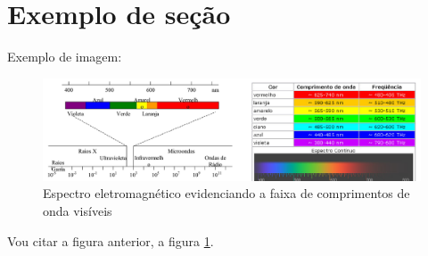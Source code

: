 \section*{Exemplo de seção}
Exemplo de imagem:
\begin{figure}[h]                                                         %
\includegraphics[width=.7\paperwidth]{figura1} %
\caption{Espectro eletromagnético evidenciando a faixa de comprimentos de onda visíveis}
\label{fig:espectro}
\end{figure}
Vou citar a figura anterior, a figura \ref{fig:espectro}.